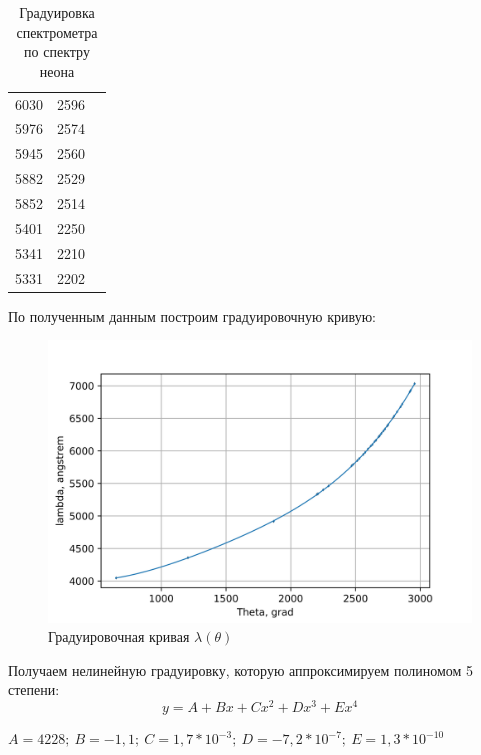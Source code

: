 \documentclass[a4paper,12pt]{report}
\begin{document}
\begin{table}[H]
\begin{tabular}{|ccc|}
\multicolumn{1}{|c|}{6030}   & \multicolumn{1}{c|}{2596}  &                     \\ \cline{1-2}
\multicolumn{1}{|c|}{5976}   & \multicolumn{1}{c|}{2574}  &                     \\ \cline{1-2}
\multicolumn{1}{|c|}{5945}   & \multicolumn{1}{c|}{2560}  &                     \\ \cline{1-2}
\multicolumn{1}{|c|}{5882}   & \multicolumn{1}{c|}{2529}  &                     \\ \cline{1-2}
\multicolumn{1}{|c|}{5852}   & \multicolumn{1}{c|}{2514}  &                     \\ \cline{1-2}
\multicolumn{1}{|c|}{5401}   & \multicolumn{1}{c|}{2250}  &                     \\ \cline{1-2}
\multicolumn{1}{|c|}{5341}   & \multicolumn{1}{c|}{2210}  &                     \\ \cline{1-2}
\multicolumn{1}{|c|}{5331}   & \multicolumn{1}{c|}{2202}  &                     \\ \hline
\end{tabular}
\caption{Градуировка спектрометра по спектру неона}
\end{table}

По полученным данным построим градуировочную кривую:

	\begin{figure}[H]
		\centering
		\includegraphics[width=0.7\linewidth]{grad.png}
		\caption{Градуировочная кривая $\lambda(\theta)$}
		\label{ris mu}
	\end{figure}

Получаем нелинейную градуировку, которую аппроксимируем полиномом 5 степени:
\begin{equation*}
    y = A + Bx + Cx^2 + Dx^3 + Ex^4
\end{equation*}
\begin{center}
$A = 4228; \ B = -1,1;\ C = 1,7 * 10^{-3};\ D = -7,2 * 10^{-7}; \ E = 1,3 * 10^{-10}$    
\end{center}
\end{document}
